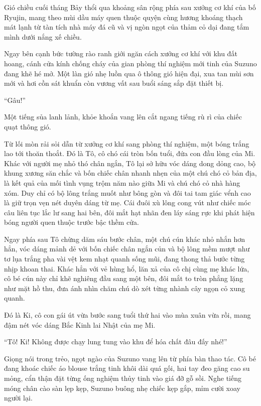 \documentclass[../main.tex]{subfiles}
\begin{document}
Gió chiều cuối tháng Bảy thổi qua khoảng sân rộng phía sau xưởng cơ khí của bố Ryujin, mang theo mùi dầu máy quen thuộc quyện cùng hương khoáng thạch mát lạnh từ tàn tích nhà máy đá cũ và vị ngòn ngọt của thảm cỏ dại đang tắm mình dưới nắng xế chiều.

Ngay bên cạnh bức tường rào ranh giới ngăn cách xưởng cơ khí với khu đất hoang, cánh cửa kính chống cháy của gian phòng thí nghiệm mới tinh của Suzuno đang khẽ hé mở. Một làn gió nhẹ luồn qua ô thông gió hiện đại, xua tan mùi sơn mới và hơi cồn sát khuẩn còn vương vất sau buổi sáng sắp đặt thiết bị.

``Gâu!''

Một tiếng sủa lanh lảnh, khỏe khoắn vang lên cắt ngang tiếng rù rì của chiếc quạt thông gió.

Từ lối mòn rải sỏi dẫn từ xưởng cơ khí sang phòng thí nghiệm, một bóng trắng lao tới thoăn thoắt. Đó là Tô, cô chó cái tròn bốn tuổi, đứa con đầu lòng của Mi. Khác với người mẹ nhỏ thó chân ngắn, Tô lại sở hữu vóc dáng dong dỏng cao, bộ khung xương săn chắc và bốn chiếc chân nhanh nhẹn của một chú chó cỏ bản địa, là kết quả của mối tình vụng trộm năm nào giữa Mi và chú chó cỏ nhà hàng xóm. Duy chỉ có bộ lông trắng muốt như bông gòn và đôi tai tam giác vểnh cao là giữ trọn vẹn nét duyên dáng từ mẹ. Cái đuôi xù lông cong vút như chiếc móc câu liên tục lắc lư sang hai bên, đôi mắt hạt nhãn đen láy sáng rực khi phát hiện bóng người quen thuộc trước bậc thềm cửa.

Ngay phía sau Tô chừng dăm sáu bước chân, một chú cún khác nhỏ nhắn hơn hẳn, vóc dáng mảnh dẻ với bốn chiếc chân ngắn củn và bộ lông mềm mượt như tơ lụa trắng pha vài vệt kem nhạt quanh sống mũi, đang thong thả bước từng nhịp khoan thai. Khác hẳn với vẻ hùng hổ, lăn xả của cô chị cùng mẹ khác lứa, cô bé cún này chỉ khẽ nghiêng đầu sang một bên, đôi mắt to tròn phẳng lặng như mặt hồ thu, đưa ánh nhìn chăm chú dò xét từng nhành cây ngọn cỏ xung quanh.

Đó là Ki, cô con gái út vừa bước sang tuổi thứ hai vào mùa xuân vừa rồi, mang đậm nét vóc dáng Bắc Kinh lai Nhật của mẹ Mi.

``Tô! Ki! Không được chạy lung tung vào khu để hóa chất đâu đấy nhé!''

Giọng nói trong trẻo, ngọt ngào của Suzuno vang lên từ phía bàn thao tác. Cô bé đang khoác chiếc áo blouse trắng tinh khôi dài quá gối, hai tay đeo găng cao su mỏng, cẩn thận đặt từng ống nghiệm thủy tinh vào giá đỡ gỗ sồi. Nghe tiếng móng chân cào sàn lẹp kẹp, Suzuno buông nhẹ chiếc kẹp gắp, mỉm cười xoay người lại.
\end{document}
